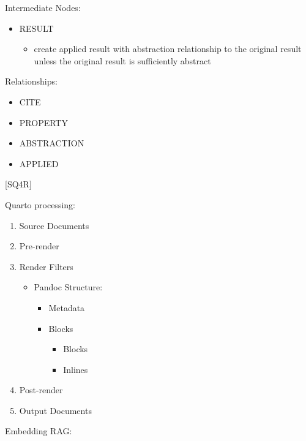 \documentclass[
  british,
]{article}
\providecommand{\tightlist}{%
  \setlength{\itemsep}{0pt}\setlength{\parskip}{0pt}}
\begin{document}
Intermediate Nodes:

\begin{itemize}
\tightlist
\item
  RESULT

  \begin{itemize}
  \tightlist
  \item
    create applied result with abstraction relationship to the original
    result unless the original result is sufficiently abstract
  \end{itemize}
\end{itemize}

Relationships:

\begin{itemize}
\tightlist
\item
  CITE
\item
  PROPERTY
\item
  ABSTRACTION
\item
  APPLIED
\end{itemize}

{[}SQ4R{]}

Quarto processing:

\begin{enumerate}
\def\labelenumi{\arabic{enumi}.}
\setcounter{enumi}{-1}
\tightlist
\item
  Source Documents
\item
  Pre-render
\item
  Render Filters

  \begin{itemize}
  \tightlist
  \item
    Pandoc Structure:

    \begin{itemize}
    \tightlist
    \item
      Metadata
    \item
      Blocks

      \begin{itemize}
      \tightlist
      \item
        Blocks
      \item
        Inlines
      \end{itemize}
    \end{itemize}
  \end{itemize}
\item
  Post-render
\item
  Output Documents
\end{enumerate}

Embedding RAG:
\end{document}
